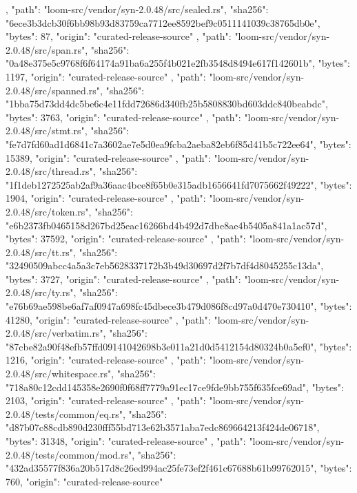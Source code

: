 {{    },
    {
      "path": "loom-src/vendor/syn-2.0.48/src/sealed.rs",
      "sha256": "6ece3b3dcb30f6bb98b93d83759ca7712ee8592bef9c0511141039c38765db0e",
      "bytes": 87,
      "origin": "curated-release-source"
    },
    {
      "path": "loom-src/vendor/syn-2.0.48/src/span.rs",
      "sha256": "0a48e375e5c9768f6f64174a91ba6a255f4b021e2fb3548d8494e617f142601b",
      "bytes": 1197,
      "origin": "curated-release-source"
    },
    {
      "path": "loom-src/vendor/syn-2.0.48/src/spanned.rs",
      "sha256": "1bba75d73dd4dc5be6c4e11fdd72686d340fb25b5808830bd603ddc840beabdc",
      "bytes": 3763,
      "origin": "curated-release-source"
    },
    {
      "path": "loom-src/vendor/syn-2.0.48/src/stmt.rs",
      "sha256": "fe7d7fd60ad1d6841c7a3602ae7e5d0ea9fcba2aeba82eb6f85d41b5c722ee64",
      "bytes": 15389,
      "origin": "curated-release-source"
    },
    {
      "path": "loom-src/vendor/syn-2.0.48/src/thread.rs",
      "sha256": "1f1deb1272525ab2af9a36aac4bce8f65b0e315adb1656641fd7075662f49222",
      "bytes": 1904,
      "origin": "curated-release-source"
    },
    {
      "path": "loom-src/vendor/syn-2.0.48/src/token.rs",
      "sha256": "e6b2373fb0465158d267bd25eac16266bd4b492d7dbe8ae4b5405a841a1ac57d",
      "bytes": 37592,
      "origin": "curated-release-source"
    },
    {
      "path": "loom-src/vendor/syn-2.0.48/src/tt.rs",
      "sha256": "32490509abcc4a5a3c7eb5628337172b3b49d30697d2f7b7df4d8045255c13da",
      "bytes": 3727,
      "origin": "curated-release-source"
    },
    {
      "path": "loom-src/vendor/syn-2.0.48/src/ty.rs",
      "sha256": "e76b69ae598be6af7af0947a698fc45dbece3b479d086f8cd97a0d470e730410",
      "bytes": 41280,
      "origin": "curated-release-source"
    },
    {
      "path": "loom-src/vendor/syn-2.0.48/src/verbatim.rs",
      "sha256": "87cbe82a90f48efb57ffd09141042698b3e011a21d0d5412154d80324b0a5ef0",
      "bytes": 1216,
      "origin": "curated-release-source"
    },
    {
      "path": "loom-src/vendor/syn-2.0.48/src/whitespace.rs",
      "sha256": "718a80c12cdd145358e2690f0f68ff7779a91ec17ce9fde9bb755f635fce69ad",
      "bytes": 2103,
      "origin": "curated-release-source"
    },
    {
      "path": "loom-src/vendor/syn-2.0.48/tests/common/eq.rs",
      "sha256": "d87b07c88cdb890d230fff55bd713e62b3571aba7edc869664213f424de06718",
      "bytes": 31348,
      "origin": "curated-release-source"
    },
    {
      "path": "loom-src/vendor/syn-2.0.48/tests/common/mod.rs",
      "sha256": "432ad35577f836a20b517d8c26ed994ac25fe73ef2f461c67688b61b99762015",
      "bytes": 760,
      "origin": "curated-release-source"
}}
